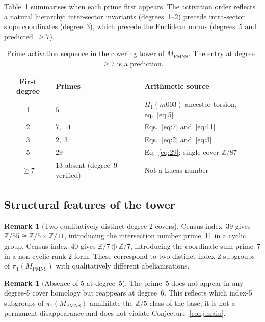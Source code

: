 \documentclass[12pt]{article}
\theoremstyle{definition}
\newtheorem{remark}[theorem]{Remark}
\begin{document}
Table~\ref{tab:activation} summarises when each prime first appears.
The activation order reflects a natural hierarchy: inter-sector invariants
(degrees~1--2) precede intra-sector slope coordinates (degree~3), which
precede the Euclidean norms (degrees~5 and predicted~$\geq 7$).

\begin{table}[htbp]
\centering
\caption{Prime activation sequence in the covering tower of
  $M_{\mathrm{PMNS}}$. The entry at degree~$\geq 7$ is a prediction.}
\label{tab:activation}
\begin{tabular}{cll}
\toprule
First degree & Primes & Arithmetic source \\
\midrule
1 & $5$      & $H_1(m003)$ ancestor torsion, eq.~\eqref{eq:5} \\
2 & $7,\;11$ & Eqs.~\eqref{eq:7} and~\eqref{eq:11} \\
3 & $2,\;3$  & Eqs.~\eqref{eq:2} and~\eqref{eq:3} \\
5 & $29$     & Eq.~\eqref{eq:29}; single cover $\mathbb{Z}/87$ \\
$\geq 7$ & $13$ absent (degree~9 verified) & Not a Lucas number \\
\bottomrule
\end{tabular}
\end{table}

\subsection{Structural features of the tower}

\begin{remark}[Two qualitatively distinct degree-2 covers]
Census index~39 gives $\mathbb{Z}/55 \cong \mathbb{Z}/5 \times
\mathbb{Z}/11$, introducing the intersection number prime~11 in a cyclic
group. Census index~40 gives $\mathbb{Z}/7 \oplus \mathbb{Z}/7$,
introducing the coordinate-sum prime~7 in a non-cyclic rank-2 form.
These correspond to two distinct index-2 subgroups of
$\pi_1(M_{\mathrm{PMNS}})$ with qualitatively different abelianisations.
\end{remark}

\begin{remark}[Absence of $5$ at degree~5]
The prime~5 does not appear in any degree-5 cover homology but reappears
at degree~6. This reflects which index-5 subgroups of
$\pi_1(M_{\mathrm{PMNS}})$ annihilate the $\mathbb{Z}/5$ class of the
base; it is not a permanent disappearance and does not violate
Conjecture~\ref{conj:main}.
\end{remark}
\end{document}
